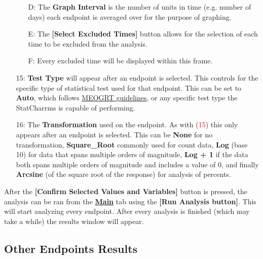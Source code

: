 \documentclass[a4paper]{article}
\begin{document}
\begin{enumerate}
\begin{enumerate}
		\item[\begingroup\color{red}D:\endgroup] The \textbf{Graph Interval} is the number of units in time (e.g. number of days) each endpoint is averaged over for the 
			purpose of graphing.  
		
		\item[\begingroup\color{red}E:\endgroup] The \textbf{[Select Excluded Times]} button allows for the selection of each time to be excluded from the analysis. 
		
		\item[\begingroup\color{red}F:\endgroup] Every excluded time will be displayed within this frame.
		
	\end{enumerate}
	
\item[\begingroup\color{red}15:\endgroup] \textbf{Test Type} will appear after an endpoint is selected. 
	This controls for the specific type of statistical test used for that endpoint.  
	This can be set to \textbf{Auto}, which follows \hyperlink{fig:FlowChart}{MEOGRT guidelines}, or any 
	specific test type the StatCharrms is capable of performing.

\item[\begingroup\color{red}16:\endgroup] The \textbf{Transformation} used on the endpoint. As with (\textcolor{red}{15}) this only appears after an endpoint is selected.  
	This can be \textbf{None} for no transformation, \textbf{Square\_Root} commonly used for count data,
	\textbf{Log}  (base 10) for data that spans multiple orders of magnitude, \textbf{Log + 1} if 
	the data both spans multiple orders of magnitude and includes a value of 0, and finally \textbf{Arcsine} (of the square root of the response)
	for analysis of percents.
	
\end{enumerate}	
	
	After the \textbf{[Confirm Selected Values and Variables]} button is pressed, the analysis can be ran from the 
	\hyperlink{fig:OEMain}{\textbf{Main}} tab 
	using the \textbf{[Run Analysis button]}. This will start analyzing every endpoint. 
	After every analysis is finished (which may take a while) the results window will appear.  

	
\label{subsec:OtherEndpointsResults}
\subsection*{Other Endpoints Results}
	
\end{document}
